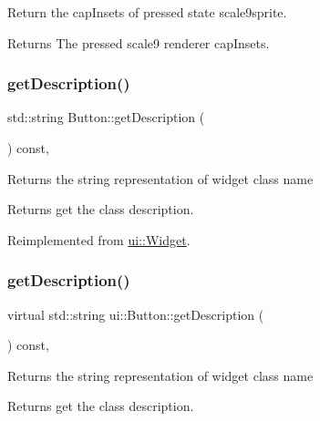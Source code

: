 Return the cap\+Insets of pressed state scale9sprite. \begin{DoxyReturn}{Returns}
The pressed scale9 renderer cap\+Insets. 
\end{DoxyReturn}
\mbox{\label{classui_1_1Button_a83561b6b24c0895c5aab6f746a6ecf61}} 
\subsubsection{\texorpdfstring{get\+Description()}{getDescription()}\hspace{0.1cm}{\footnotesize\ttfamily [1/2]}}
{\footnotesize\ttfamily std\+::string Button\+::get\+Description (\begin{DoxyParamCaption}{ }\end{DoxyParamCaption}) const\hspace{0.3cm}{\ttfamily [override]}, {\ttfamily [virtual]}}

Returns the string representation of widget class name \begin{DoxyReturn}{Returns}
get the class description. 
\end{DoxyReturn}


Reimplemented from \hyperlink{classui_1_1Widget_ad85abdaa9133dc6b8efc32670ae9b93f}{ui\+::\+Widget}.

\mbox{\label{classui_1_1Button_a4b06a101bd62b33f40d2e400e42211fc}} 
\subsubsection{\texorpdfstring{get\+Description()}{getDescription()}\hspace{0.1cm}{\footnotesize\ttfamily [2/2]}}
{\footnotesize\ttfamily virtual std\+::string ui\+::\+Button\+::get\+Description (\begin{DoxyParamCaption}{ }\end{DoxyParamCaption}) const\hspace{0.3cm}{\ttfamily [override]}, {\ttfamily [virtual]}}

Returns the string representation of widget class name \begin{DoxyReturn}{Returns}
get the class description. 
\end{DoxyReturn}


